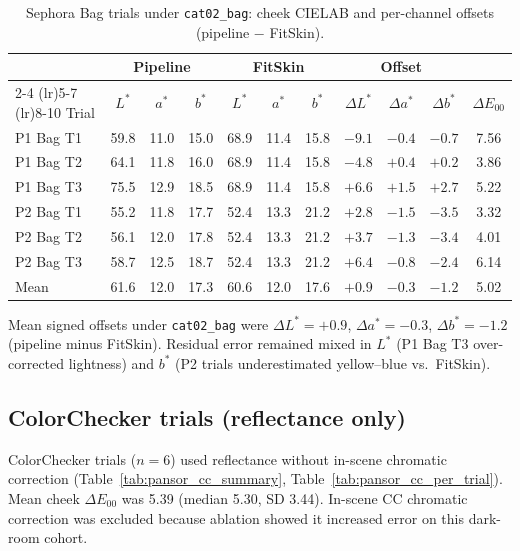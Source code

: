 \documentclass[11pt]{article}
\newcommand{\deee}{\ensuremath{\Delta E_{00}}}
\begin{document}
\begin{table}[htbp]
\centering
\caption{Sephora Bag trials under \texttt{cat02\_bag}: cheek CIELAB and per-channel offsets (pipeline $-$ FitSkin).}
\label{tab:pansor_bag_lab}
\small
\begin{tabular}{lcccccccccc}
\toprule
& \multicolumn{3}{c}{Pipeline} & \multicolumn{3}{c}{FitSkin} &
\multicolumn{3}{c}{Offset} & \\
\cmidrule(lr){2-4} \cmidrule(lr){5-7} \cmidrule(lr){8-10}
{Trial} & $L^*$ & $a^*$ & $b^*$ & $L^*$ & $a^*$ & $b^*$ &
$\Delta L^*$ & $\Delta a^*$ & $\Delta b^*$ & $\deee$ \\
\midrule
P1 Bag T1 & 59.8 & 11.0 & 15.0 & 68.9 & 11.4 & 15.8 & $-9.1$ & $-0.4$ & $-0.7$ & 7.56 \\
P1 Bag T2 & 64.1 & 11.8 & 16.0 & 68.9 & 11.4 & 15.8 & $-4.8$ & $+0.4$ & $+0.2$ & 3.86 \\
P1 Bag T3 & 75.5 & 12.9 & 18.5 & 68.9 & 11.4 & 15.8 & $+6.6$ & $+1.5$ & $+2.7$ & 5.22 \\
P2 Bag T1 & 55.2 & 11.8 & 17.7 & 52.4 & 13.3 & 21.2 & $+2.8$ & $-1.5$ & $-3.5$ & 3.32 \\
P2 Bag T2 & 56.1 & 12.0 & 17.8 & 52.4 & 13.3 & 21.2 & $+3.7$ & $-1.3$ & $-3.4$ & 4.01 \\
P2 Bag T3 & 58.7 & 12.5 & 18.7 & 52.4 & 13.3 & 21.2 & $+6.4$ & $-0.8$ & $-2.4$ & 6.14 \\
\midrule
Mean   & 61.6 & 12.0 & 17.3 & 60.6 & 12.0 & 17.6 & $+0.9$ & $-0.3$ & $-1.2$ & 5.02 \\
\bottomrule
\end{tabular}
\end{table}

Mean signed offsets under \texttt{cat02\_bag} were $\Delta L^*=+0.9$, $\Delta a^*=-0.3$, $\Delta b^*=-1.2$ (pipeline minus FitSkin). Residual error remained mixed in $L^*$ (P1 Bag T3 over-corrected lightness) and $b^*$ (P2 trials underestimated yellow--blue vs.\ FitSkin).

\subsection{ColorChecker trials (reflectance only)}

ColorChecker trials ($n=6$) used reflectance without in-scene chromatic correction (Table~\ref{tab:pansor_cc_summary}, Table~\ref{tab:pansor_cc_per_trial}). Mean cheek $\deee$ was 5.39 (median 5.30, SD 3.44). In-scene CC chromatic correction was excluded because ablation showed it increased error on this dark-room cohort.
\end{document}
